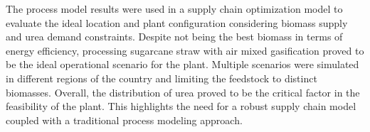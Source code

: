 \documentclass[a4paper, titlepage]{article}
\begin{document}
The process model results were used in a supply chain optimization model to evaluate the ideal location and plant
configuration considering biomass supply and urea demand constraints. Despite not being the best biomass in terms
of energy efficiency, processing sugarcane straw with air mixed gasification proved to be the ideal operational scenario
for the plant. Multiple scenarios were simulated in different regions of the country and limiting the feedstock to distinct biomasses. Overall, the distribution of urea proved to be the critical factor in the feasibility of the plant. This highlights
the need for a robust supply chain model coupled with a traditional process modeling approach.

\clearpage

\printbibliography{}
\end{document}
